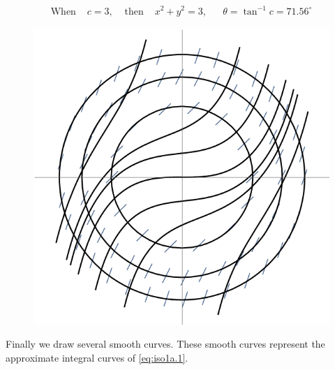 \documentclass[../main-sheet.tex]{subfiles}
\begin{document}
\begin{soln}[a]
\begin{align*}
        \text{When } & c=3, & \text{ then } & x^2+y^2=3, &&\theta=\tan^{-1}c=71.56^{\circ}
    \end{align*}
    \begin{figure}[H]
        \centering
        \includegraphics{pr1.png}
    \end{figure}
    Finally we draw several smooth curves. These smooth curves represent the approximate integral curves of \eqref{eq:iso1a.1}.
\end{soln}
\end{document}
